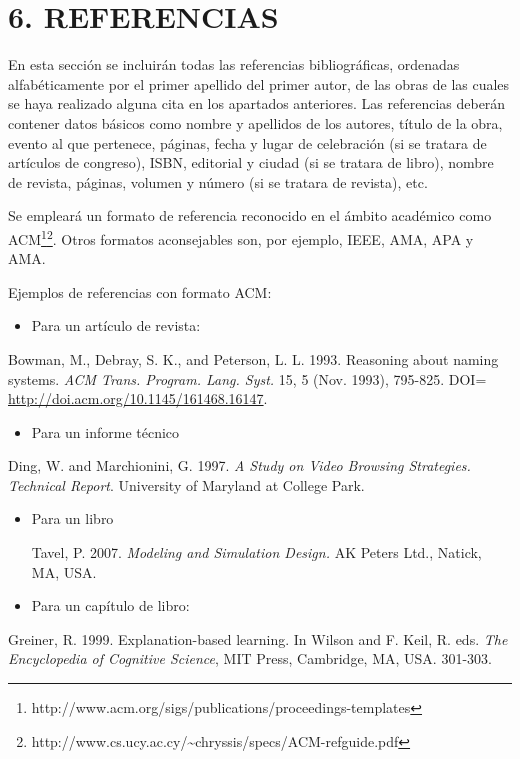 \documentclass[a4paper]{article}
\newcommand\liststyleLi{%
\renewcommand\labelitemi{{\textbullet}}
\renewcommand\labelitemii{${\circ}$}%
\renewcommand\labelitemiii{${\blacksquare}$}
\renewcommand\labelitemiv{{\textbullet}}
}
\newcommand\liststyleLii{%
\renewcommand\labelitemi{{\textbullet}}
\renewcommand\labelitemii{${\circ}$}
\renewcommand\labelitemiii{${\blacksquare}$}
\renewcommand\labelitemiv{{\textbullet}}
}
\newcommand\liststyleLiii{%
\renewcommand\labelitemi{{\textbullet}}
\renewcommand\labelitemii{${\circ}$}
\renewcommand\labelitemiii{${\blacksquare}$}
\renewcommand\labelitemiv{{\textbullet}}
}
\newcommand\liststyleLiv{%
\renewcommand\labelitemi{{\textbullet}}
\renewcommand\labelitemii{${\circ}$}
\renewcommand\labelitemiii{${\blacksquare}$}
\renewcommand\labelitemiv{{\textbullet}}
}
\begin{document}
\section[6. REFERENCIAS]{6. REFERENCIAS}
En esta secci\'on se incluir\'an todas las referencias bibliogr\'aficas, ordenadas alfab\'eticamente por el primer
apellido del primer autor, de las obras de las cuales se haya realizado alguna cita en los apartados anteriores. Las
referencias deber\'an contener datos b\'asicos como nombre y apellidos de los autores, t\'itulo de la obra, evento al
que pertenece, p\'aginas, fecha y lugar de celebraci\'on (si se tratara de art\'iculos de congreso), ISBN, editorial y
ciudad (si se tratara de libro), nombre de revista, p\'aginas, volumen y n\'umero (si se tratara de revista), etc.

Se emplear\'a un formato de referencia reconocido en el \'ambito acad\'emico como
ACM\footnote{http://www.acm.org/sigs/publications/proceedings-templates}\footnote{http://www.cs.ucy.ac.cy/\~{}chryssis/specs/ACM-refguide.pdf}.
Otros formatos aconsejables son, por ejemplo, IEEE, AMA, APA y AMA.

Ejemplos de referencias con formato ACM:

\liststyleLi
\begin{itemize}
\item Para un art\'iculo de revista:
\end{itemize}
Bowman, M., Debray, S. K., and Peterson, L. L. 1993. Reasoning about naming systems. \textit{ACM Trans. Program. Lang.
Syst.} 15, 5 (Nov. 1993), 795-825. DOI= \url{http://doi.acm.org/10.1145/161468.16147}.

\liststyleLii
\begin{itemize}
\item Para un informe t\'ecnico
\end{itemize}
Ding, W. and Marchionini, G. 1997. \textit{A Study on Video Browsing Strategies. Technical Report}. University of
Maryland at College Park.

\liststyleLiii
\begin{itemize}
\item Para un libro

Tavel, P. 2007. \textit{Modeling and Simulation Design.} AK Peters Ltd., Natick, MA, USA.
\end{itemize}
\liststyleLiv
\begin{itemize}
\item Para un cap\'itulo de libro:
\end{itemize}
Greiner, R. 1999. Explanation-based learning. In Wilson and F. Keil, R. eds. \textit{The Encyclopedia of Cognitive
Science}, MIT Press, Cambridge, MA, USA. 301-303.
\end{document}
